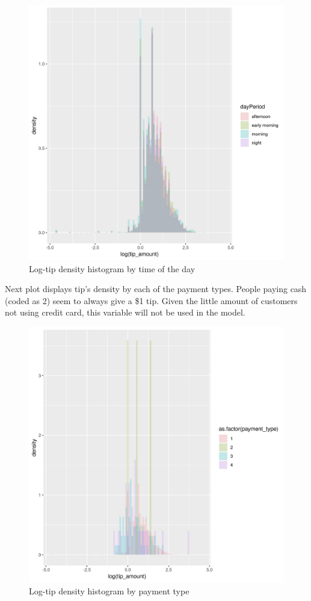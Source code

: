 \documentclass[11pt]{article}
\begin{document}
\begin{figure}[htbp]
\centering
\includegraphics[width=.9\linewidth]{./plots/dayPeriodTipDensityHist.jpg}
\caption{\label{fig:org53e1af9}
Log-tip density histogram by time of the day}
\end{figure}

Next plot displays tip's density by each of the payment types.
People paying cash (coded as 2) seem to always give a \$1 tip.
Given the little amount of customers not using credit card, this
variable will not be used in the model.

\begin{figure}[htbp]
\centering
\includegraphics[width=.9\linewidth]{./plots/paymentTipDensityHist.jpg}
\caption{\label{fig:org99cbaa0}
Log-tip density histogram by payment type}
\end{figure}
\end{document}
